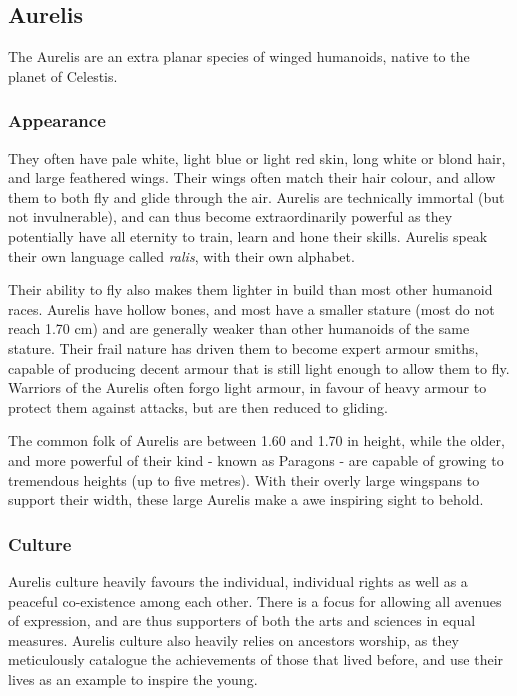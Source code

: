 \subsection{Aurelis}
\label{sec:Aurelis}

The Aurelis are an extra planar species of winged humanoids, native to the
planet of Celestis.

\subsubsection{Appearance}

They often have pale white, light blue or light red skin, long white or blond
hair, and large feathered wings. Their wings often match their hair colour,
and allow them to both fly and glide through the air. Aurelis are technically
immortal (but not invulnerable), and can thus become extraordinarily powerful
as they potentially have all eternity to train, learn and hone their
skills. Aurelis speak their own language called \emph{ralis}, with their own
alphabet.

Their ability to fly also makes them lighter in build than most other humanoid
races. Aurelis have hollow bones, and most have a smaller stature (most do not
reach 1.70 cm) and are generally weaker than other humanoids of the same
stature. Their frail nature has driven them to become expert armour smiths,
capable of producing decent armour that is still light enough to allow them to
fly. Warriors of the Aurelis often forgo light armour, in favour of heavy
armour to protect them against attacks, but are then reduced to gliding.

The common folk of Aurelis are between 1.60 and 1.70 in height, while the
older, and more powerful of their kind - known as Paragons - are capable of
growing to tremendous heights (up to five metres). With their overly large
wingspans to support their width, these large Aurelis make a awe inspiring
sight to behold.

\subsubsection{Culture}

Aurelis culture heavily favours the individual, individual rights as well as
a peaceful co-existence among each other. There is a focus for allowing all
avenues of expression, and are thus supporters of both the arts and sciences
in equal measures. Aurelis culture also heavily relies on ancestors worship,
as they meticulously catalogue the achievements of those that lived before,
and use their lives as an example to inspire the young.

